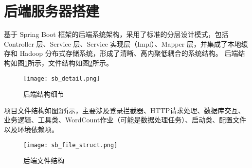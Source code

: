 \documentclass[bachelor]{thesis-uestc}
\begin{document}
\section{后端服务器搭建}
基于 Spring Boot 框架的后端系统架构，采用了标准的分层设计模式，包括 Controller 层、Service 层、Service 实现层（Impl）、Mapper 层，并集成了本地缓存和 Hadoop 分布式存储系统，形成了清晰、高内聚低耦合的系统结构。
后端结构如图\ref{sb_2}所示，文件结构如图\ref{sb_s}所示。
\begin{figure}[htbp]
    \centering
    \texttt{[image: sb\_detail.png]}
    \caption{后端结构细节}
    \label{sb_2}
\end{figure}
项目文件结构如图\ref{sb_s}所示，主要涉及登录拦截器、HTTP请求处理、数据库交互、业务逻辑、工具类、WordCount作业（可能是数据处理任务）、启动类、配置文件以及环境依赖项。
\begin{figure}[htbp]
    \centering
    \texttt{[image: sb\_file\_struct.png]}
    \caption{后端文件结构}
    \label{sb_s}
\end{figure}
\end{document}
